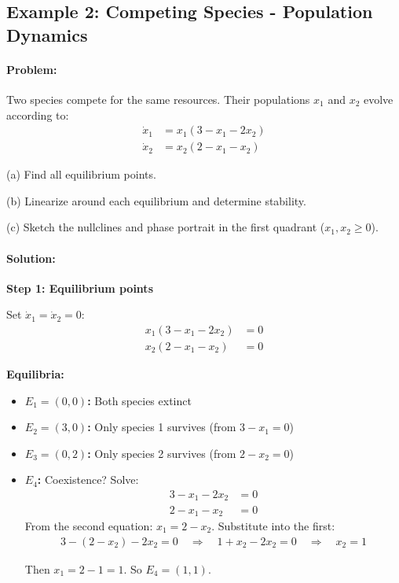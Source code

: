 \documentclass[11pt,a4paper]{article}
\begin{document}
\subsection{Example 2: Competing Species - Population Dynamics}

\paragraph{Problem:} Two species compete for the same resources. Their populations $x_1$ and $x_2$ evolve according to:
\begin{align}
  \dot{x}_1 &= x_1(3 - x_1 - 2x_2) \\
  \dot{x}_2 &= x_2(2 - x_1 - x_2)
\end{align}

(a) Find all equilibrium points.

(b) Linearize around each equilibrium and determine stability.

(c) Sketch the nullclines and phase portrait in the first quadrant ($x_1, x_2 \geq 0$).

\paragraph{Solution:}

\textbf{Step 1: Equilibrium points}

Set $\dot{x}_1 = \dot{x}_2 = 0$:
\begin{align}
  x_1(3 - x_1 - 2x_2) &= 0 \\
  x_2(2 - x_1 - x_2) &= 0
\end{align}

\textbf{Equilibria:}
\begin{itemize}
  \item \textbf{$E_1 = (0, 0)$:} Both species extinct
  \item \textbf{$E_2 = (3, 0)$:} Only species 1 survives (from $3 - x_1 = 0$)
  \item \textbf{$E_3 = (0, 2)$:} Only species 2 survives (from $2 - x_2 = 0$)
  \item \textbf{$E_4$:} Coexistence? Solve:
    \begin{align}
      3 - x_1 - 2x_2 &= 0 \\
      2 - x_1 - x_2 &= 0
    \end{align}
    From the second equation: $x_1 = 2 - x_2$. Substitute into the first:
    \begin{align}
      3 - (2 - x_2) - 2x_2 = 0 \quad \Rightarrow \quad 1 + x_2 - 2x_2 = 0 \quad \Rightarrow \quad x_2 = 1
    \end{align}

    Then $x_1 = 2 - 1 = 1$. So $E_4 = (1, 1)$.
\end{itemize}
\end{document}
